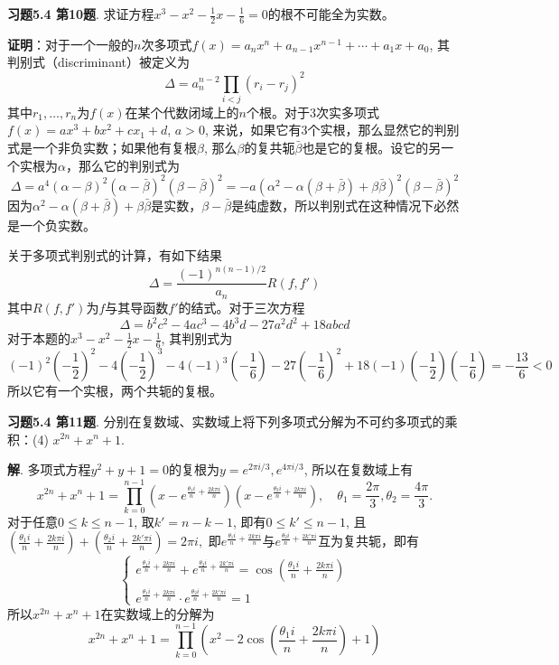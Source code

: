 
\renewcommand{\newpageorvspace}{\vspace{2em}}

\date{2021-12-24  第七次习题课}



\maketitle

{\bf 习题5.4 第10题}. 求证方程$x^3 - x^2 - \frac{1}{2}x - \frac{1}{6} = 0$的根不可能全为实数。

{\bf 证明}：对于一个一般的$n$次多项式$f(x) = a_{n}x^{n}+a_{n-1}x^{n-1}+\cdots +a_{1}x+a_{0}$, 其判别式（discriminant）被定义为
$$\Delta = a_n^{n-2} \prod_{i< j} (r_i - r_j)^2$$
其中$r_1,\ldots, r_n$为$f(x)$在某个代数闭域上的$n$个根。对于3次实多项式$f(x) = ax^3+bx^2+cx_1+d$, $a > 0$, 来说，如果它有3个实根，那么显然它的判别式是一个非负实数；如果他有复根$\beta$, 那么$\beta$的复共轭$\bar{\beta}$也是它的复根。设它的另一个实根为$\alpha$，那么它的判别式为
$$\Delta = a^4 (\alpha-\beta)^2(\alpha-\bar{\beta})^2(\beta-\bar{\beta})^2 = -a(\alpha^2-\alpha(\beta+\bar{\beta})+\beta\bar{\beta})^2 (\beta-\bar{\beta})^2$$
因为$\alpha^2-\alpha(\beta+\bar{\beta})+\beta\bar{\beta}$是实数，$\beta-\bar{\beta}$是纯虚数，所以判别式在这种情况下必然是一个负实数。

关于多项式判别式的计算，有如下结果
$$\Delta = \frac{(-1)^{n(n-1)/2}}{a_n} R(f,f')$$
其中$R(f,f')$为$f$与其导函数$f'$的结式。对于三次方程
$$\Delta = b^{2}c^{2}-4ac^{3}-4b^{3}d-27a^{2}d^{2}+18abcd$$
对于本题的$x^3 - x^2 - \frac{1}{2}x - \frac{1}{6}$, 其判别式为
$$(-1)^2(-\frac{1}{2})^2 - 4(-\frac{1}{2})^3 - 4(-1)^3(-\frac{1}{6}) - 27(-\frac{1}{6})^2 + 18(-1)(-\frac{1}{2})(-\frac{1}{6}) = -\frac{13}{6} < 0$$
所以它有一个实根，两个共轭的复根。

\newpageorvspace


{\bf 习题5.4 第11题}. 分别在复数域、实数域上将下列多项式分解为不可约多项式的乘积：(4) $x^{2n} + x^n + 1$.

{\bf 解}. 多项式方程$y^2 + y + 1 = 0$的复根为$y = e^{2\pi i/3}, e^{4\pi i/3}$, 所以在复数域上有
$$x^{2n} + x^n + 1 = \prod_{k=0}^{n-1} (x - e^{\frac{\theta_1 i}{n} + \frac{2k\pi i}{n}})(x - e^{\frac{\theta_2 i}{n} + \frac{2k\pi i}{n}}), \quad \theta_1 = \frac{2\pi}{3}, \theta_2 = \frac{4\pi}{3}.$$
对于任意$0\leqslant k \leqslant n-1$, 取$k' = n-k-1$, 即有$0\leqslant k' \leqslant n-1$, 且$(\frac{\theta_1 i}{n} + \frac{2k\pi i}{n}) + (\frac{\theta_2 i}{n} + \frac{2k'\pi i}{n}) = 2\pi i,$ 即$e^{\frac{\theta_1 i}{n} + \frac{2k\pi i}{n}}$与$e^{\frac{\theta_2 i}{n} + \frac{2k'\pi i}{n}}$互为复共轭，即有
$$
\begin{cases}
e^{\frac{\theta_1 i}{n} + \frac{2k\pi i}{n}} + e^{\frac{\theta_2 i}{n} + \frac{2k'\pi i}{n}} = \cos(\frac{\theta_1 i}{n} + \frac{2k\pi i}{n}) \\
e^{\frac{\theta_1 i}{n} + \frac{2k\pi i}{n}} \cdot e^{\frac{\theta_2 i}{n} + \frac{2k'\pi i}{n}} = 1
\end{cases}
$$
所以$x^{2n} + x^n + 1$在实数域上的分解为
$$x^{2n} + x^n + 1 = \prod_{k=0}^{n-1} \left( x^2 -2 \cos \left( \frac{\theta_1 i}{n} + \frac{2k\pi i}{n} \right) + 1 \right)$$

